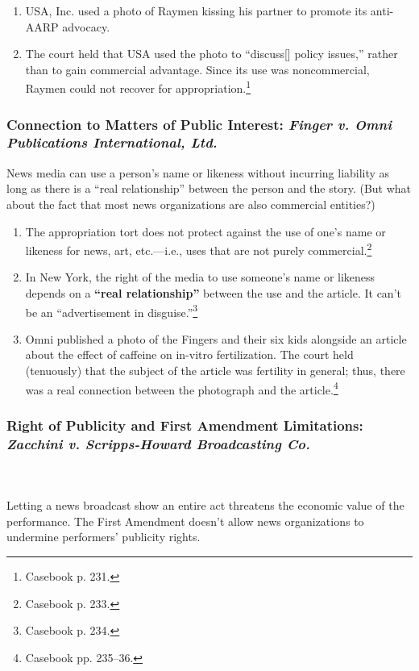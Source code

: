 \begin{enumerate}
    \item USA, Inc. used a photo of Raymen kissing his partner to promote its 
    anti-AARP advocacy.
    \item The court held that USA used the photo to ``discuss[] policy issues,'' 
    rather than to gain commercial advantage. Since its use was noncommercial, 
    Raymen could not recover for appropriation.\footnote{Casebook p. 231.}
\end{enumerate}

\subsubsection{Connection to Matters of Public Interest: \emph{Finger v. Omni 
Publications International, Ltd.}}

News media can use a person's name or likeness without incurring liability as 
long as there is a ``real relationship'' between the person and the story. (But 
what about the fact that most news organizations are also commercial entities?)

\begin{enumerate}
    \item The appropriation tort does not protect against the use of one's name 
    or likeness for news, art, etc.---i.e., uses that are not purely 
    commercial.\footnote{Casebook p. 233.}
    \item In New York, the right of the media to use someone's name or likeness 
    depends on a \textbf{``real relationship''} between the use and the article.  
    It can't be an ``advertisement in disguise.''\footnote{Casebook p. 234.}
    \item Omni published a photo of the Fingers and their six kids alongside an 
    article about the effect of caffeine on in-vitro fertilization. The court 
    held (tenuously) that the subject of the article was fertility in general; 
    thus, there was a real connection between the photograph and the 
    article.\footnote{Casebook pp. 235--36.}
\end{enumerate}

\subsubsection{Right of Publicity and First Amendment Limitations: 
\emph{Zacchini v. Scripps-Howard Broadcasting Co.}}
~\\\\
Letting a news broadcast show an entire act threatens the economic value of the 
performance. The First Amendment doesn't allow news organizations to undermine 
performers' publicity rights.

